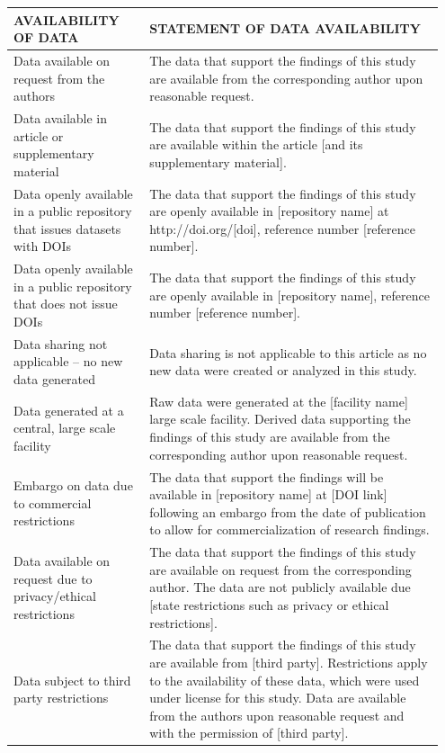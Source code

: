 \documentclass[%
 aip,
 amsmath,amssymb,
 reprint,%
]{revtex4-2}
\begin{document}
\begin{center}
\renewcommand\arraystretch{1.2}
\begin{tabular}{| p{0.3\linewidth} | p{0.65\linewidth} |}
\hline
\textbf{AVAILABILITY OF DATA} & \textbf{STATEMENT OF DATA AVAILABILITY}\\  
\hline
Data available on request from the authors
&
The data that support the findings of this study are available from the corresponding author upon reasonable request.
\\\hline
Data available in article or supplementary material
&
The data that support the findings of this study are available within the article [and its supplementary material].
\\\hline
Data openly available in a public repository that issues datasets with DOIs
&
The data that support the findings of this study are openly available in [repository name] at http://doi.org/[doi], reference number [reference number].
\\\hline
Data openly available in a public repository that does not issue DOIs
&
The data that support the findings of this study are openly available in [repository name], reference number [reference number].
\\\hline
Data sharing not applicable – no new data generated
&
Data sharing is not applicable to this article as no new data were created or analyzed in this study.
\\\hline
Data generated at a central, large scale facility
&
Raw data were generated at the [facility name] large scale facility. Derived data supporting the findings of this study are available from the corresponding author upon reasonable request.
\\\hline
Embargo on data due to commercial restrictions
&
The data that support the findings will be available in [repository name] at [DOI link] following an embargo from the date of publication to allow for commercialization of research findings.
\\\hline
Data available on request due to privacy/ethical restrictions
&
The data that support the findings of this study are available on request from the corresponding author. The data are not publicly available due [state restrictions such as privacy or ethical restrictions].
\\\hline
Data subject to third party restrictions
&
The data that support the findings of this study are available from [third party]. Restrictions apply to the availability of these data, which were used under license for this study. Data are available from the authors upon reasonable request and with the permission of [third party].
\\\hline
\end{tabular}
\end{center}
\end{document}
